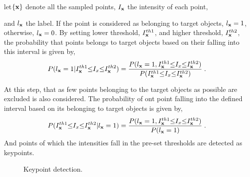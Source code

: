let$\{\bf{x}\}$ denote all the sampled points, $I_{\bf{x}}$ the intensity of each point, 
and $l_{\bf{x}}$ the label. If the point is considered as belonging to target objects, $l_{\bf{x}}=1$, otherwise, $l_{\bf{x}}=0$. By setting lower threshold, $I^{th1}_{\bf{x}}$,  and higher threshold, $I^{th2}_{\bf{x}}$, the probability that points belongs to target objects based on their falling into this interval is given by,
\begin{equation}
P(l_{\bf{x}}=1|I^{th1}_{\bf{x}}{\leq}I_x{\leq}{I^{th2}_{\bf{x}}})=
\frac
{P(l_{\bf{x}}=1,I^{th1}_{\bf{x}}{\leq}I_x{\leq}{I^{th2}_{\bf{x}}})} {P(I^{th1}_{\bf{x}}{\leq}I_x{\leq}{I^{th2}_{\bf{x}}})}\;.
\label{eq1}
\end{equation}



At this step,  that as few points belonging to the target objects as possible are excluded is also considered. The probability of ont point falling into the defined interval based on its belonging to target objects is given by,
\begin{equation}
P(I^{th1}_{\bf{x}}{\leq}I_x{\leq}{I^{th2}_{\bf{x}}}|l_{\bf{x}}=1)=
\frac
{P(l_{\bf{x}}=1,I^{th1}_{\bf{x}}{\leq}I_x{\leq}{I^{th2}_{\bf{x}}})} {P(l_{\bf{x}}=1)}\;.
\label{eq1.1}
\end{equation}
And points of which the intensities fall in the pre-set thresholds are detected as keypoints.
\begin{figure}
\centering
{}
\caption[Keypoint detection results]{Keypoint detection. }
\label{fig:sec}
\end{figure}



